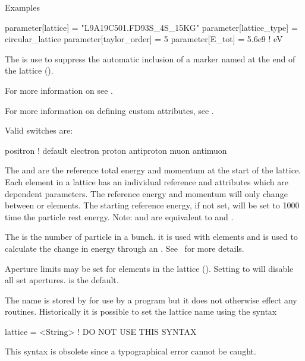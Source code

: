 \noindent
Examples
\begin{example}
  parameter[lattice]      = "L9A19C501.FD93S_4S_15KG"
  parameter[lattice_type] = circular_lattice
  parameter[taylor_order] = 5
  parameter[E_tot]        = 5.6e9    ! eV
\end{example}

The  is use to suppress the automatic inclusion
of a marker named  at the end of the lattice (). 

For more information on  see .

For more information on defining custom attributes, see .

Valid  switches are:
\begin{example}
  positron  ! default
  electron
  proton
  antiproton
  muon
  antimuon
\end{example}

The  and  are the reference
total energy and momentum at the start of the lattice. Each element
in a lattice has an individual reference  and  attributes
which are dependent parameters. The reference energy and momentum will only
change between  or  elements. The starting
reference energy, if not set, will be set to 1000 time the particle
rest energy.  Note:  and  are
equivalent to  and .

The  is the number of particle in a bunch.
it is used with  elements and is used to calculate the
change in energy through an . See~ for more
details.

Aperture limits may be set for elements in the lattice
(). Setting  to  will
disable all set apertures.  is the default.

The  name is stored by \bmad for use by a program but it does
not otherwise effect any \bmad routines. 
Historically it is possible to set the lattice name using the syntax
\begin{example}
  lattice = <String>   ! DO NOT USE THIS SYNTAX
\end{example}
This syntax is obsolete since a typographical error cannot be caught.

